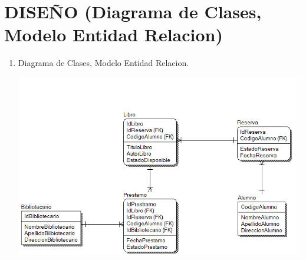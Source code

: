 \section{ DISEÑO (Diagrama de Clases, Modelo Entidad Relacion)} 

\begin{enumerate}[1.]
	\item Diagrama de Clases, Modelo Entidad Relacion.
    




	
	\begin{center}
	\includegraphics[width=20cm]{./Imagenes/img8} 
	\end{center}
	
	
\end{enumerate} 
